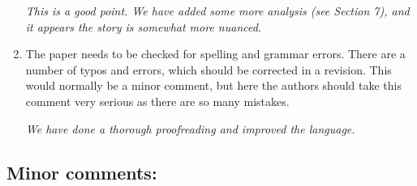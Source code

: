 \documentclass{article}
\newenvironment{response}
{\slshape}{}
\begin{document}
\begin{enumerate}
  \begin{response}
    This is a good point.  We have added some more analysis (see
    Section 7), and it appears the story is somewhat more nuanced.
  \end{response}
\item The paper needs to be checked for spelling and grammar
  errors. There are a number of typos and errors, which should be
  corrected in a revision. This would normally be a minor comment, but
  here the authors should take this comment very serious as there are
  so many mistakes.

  \begin{response}
    We have done a thorough proofreading and improved the language. 
  \end{response}
\end{enumerate}

\subsection{Minor comments:}
\end{document}

